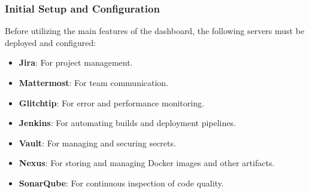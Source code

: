 \subsubsection{Initial Setup and Configuration}
Before utilizing the main features of the dashboard, the following servers must be deployed and configured:
\begin{itemize}
    \item \textbf{Jira}: For project management.
    \item \textbf{Mattermost}: For team communication.
    \item \textbf{Glitchtip}: For error and performance monitoring.
    \item \textbf{Jenkins}: For automating builds and deployment pipelines.
    \item \textbf{Vault}: For managing and securing secrets.
    \item \textbf{Nexus}: For storing and managing Docker images and other artifacts.
    \item \textbf{SonarQube}: For continuous inspection of code quality.
\end{itemize}

